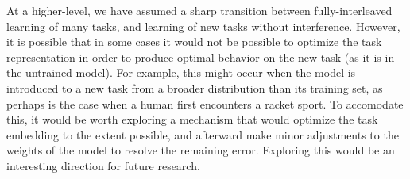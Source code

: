 At a higher-level, we have assumed a sharp transition between fully-interleaved learning of many tasks, and learning of new tasks without interference. However, it is possible that in some cases it would not be possible to optimize the task representation in order to produce optimal behavior on the new task (as it is in the untrained model). For example, this might occur when the model is introduced to a new task from a broader distribution than its training set, as perhaps is the case when a human first encounters a racket sport. To accomodate this, it would be worth exploring a mechanism that would optimize the task embedding to the extent possible, and afterward make minor adjustments to the weights of the model to resolve the remaining error. Exploring this would be an interesting direction for future research.\par

